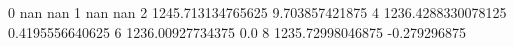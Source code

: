 0 nan nan
1 nan nan
2 1245.713134765625 9.703857421875
4 1236.4288330078125 0.4195556640625
6 1236.00927734375 0.0
8 1235.72998046875 -0.279296875
